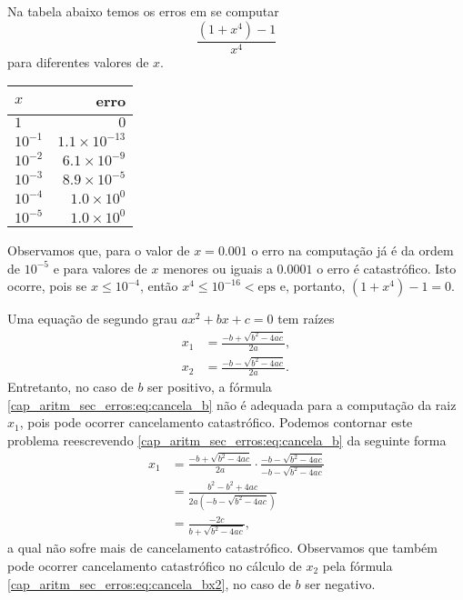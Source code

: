 \begin{ex}\label{ex:cancela_1}
  Na tabela abaixo temos os erros em se computar
  \begin{equation}
    \frac{(1+x^4)-1}{x^4}
  \end{equation}
  para diferentes valores de $x$.
  
  \begin{center}
    \begin{tabular}{l|r}
      $x$     & erro \\\hline
      $1$      & $0$ \\
      $10^{-1}$ & $1.1\times 10^{-13}$\\
      $10^{-2}$ & $6.1\times 10^{-9}$\\
      $10^{-3}$ & $8.9\times 10^{-5}$\\
      $10^{-4}$ & $1.0\times 10^{0}$\\
      $10^{-5}$ & $1.0\times 10^{0}$\\\hline
    \end{tabular}
  \end{center}
  Observamos que, para o valor de $x=0.001$ o erro na computação já é da ordem de $10^{-5}$ e para valores de $x$ menores ou iguais a $0.0001$ o erro é catastrófico. Isto ocorre, pois se $x\leq 10^{-4}$, então $x^4 \leq 10^{-16} < \mathrm{eps}$ e, portanto, $(1+x^4)-1=0$.
\end{ex}

\begin{ex}\label{ex:solpq}
  Uma equação de segundo grau $ax^2 + bx + c = 0$ tem raízes
  \begin{align}
    x_1 &= \frac{-b + \sqrt{b^2 - 4ac}}{2a},\label{cap_aritm_sec_erros:eq:cancela_b}\\
    x_2 &= \frac{-b - \sqrt{b^2 - 4ac}}{2a}.\label{cap_aritm_sec_erros:eq:cancela_bx2}
  \end{align}
Entretanto, no caso de $b$ ser positivo, a fórmula \eqref{cap_aritm_sec_erros:eq:cancela_b} não é adequada para a computação da raiz $x_1$, pois pode ocorrer cancelamento catastrófico. Podemos contornar este problema reescrevendo \eqref{cap_aritm_sec_erros:eq:cancela_b} da seguinte forma
\begin{align}
  x_1 &= \frac{-b + \sqrt{b^2 - 4ac}}{2a}\cdot \frac{-b - \sqrt{b^2 - 4ac}}{-b - \sqrt{b^2 - 4ac}}\\
  &= \frac{b^2 - b^2 + 4ac}{2a(-b-\sqrt{b^2-4ac})}\\
  &= \frac{-2c}{b+\sqrt{b^2-4ac}}\label{cap_aritm_sec_erros:eq:bx1m},
\end{align}
a qual não sofre mais de cancelamento catastrófico. Observamos que também pode ocorrer cancelamento catastrófico no cálculo de $x_2$ pela fórmula \eqref{cap_aritm_sec_erros:eq:cancela_bx2}, no caso de $b$ ser negativo.
\end{ex}

